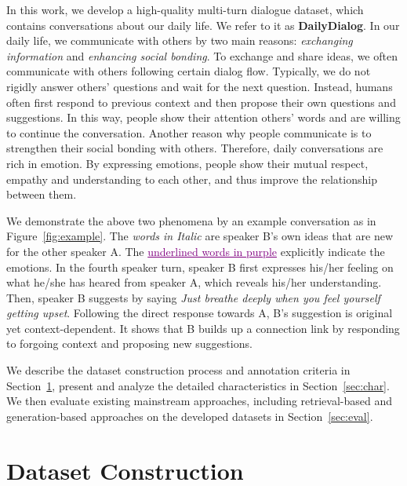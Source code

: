 \documentclass[11pt,letterpaper]{article}
\begin{document}
In this work, we develop a high-quality multi-turn dialogue dataset, which contains conversations about our daily life. We refer to it as \textbf{DailyDialog}. %
In our daily life, we communicate with others by two main reasons: \emph{exchanging information} and \emph{enhancing social bonding}. To exchange and share ideas, we often communicate with others following certain dialog flow. %
Typically, we do not rigidly answer others' questions and wait for the next question. Instead, humans often first respond to previous context and then propose their own questions and suggestions. In this way, people show their attention others' words and are willing to continue the conversation. Another reason why people communicate is to strengthen their social bonding with others. Therefore, daily conversations are rich in emotion. By expressing emotions, people show their mutual respect, empathy and understanding to each other, and thus improve the relationship between them.

We demonstrate the above two phenomena by an example conversation as in Figure~\ref{fig:example}. The \emph{words in Italic} are speaker B's own ideas that are new for the other speaker A. The \textcolor{purple}{\underline{underlined words in purple}} explicitly indicate the emotions. In the fourth speaker turn, speaker B first expresses his/her feeling on what he/she has heared from speaker A, which reveals his/her understanding. Then, speaker B suggests by saying \emph{Just breathe deeply when you feel yourself getting upset}. Following the direct response towards A, B's suggestion is original yet context-dependent. It shows that B builds up a connection link by responding to forgoing context and proposing new suggestions. 

We describe the dataset construction process and annotation criteria in Section~\ref{sec:dataset}, present and analyze the detailed characteristics in Section~\ref{sec:char}. We then evaluate existing mainstream approaches, including retrieval-based and generation-based approaches on the developed datasets in Section~\ref{sec:eval}. 

\section{Dataset Construction}
\label{sec:dataset}
\end{document}
